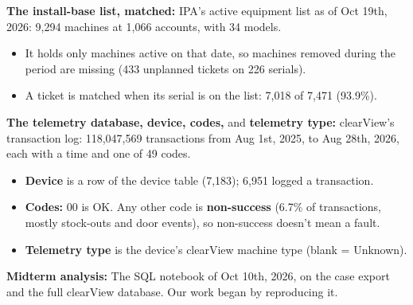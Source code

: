 \begin{ipadefs}
\begin{itemize}
\end{itemize}
\item \textbf{The install-base list, matched:} IPA's active equipment list as of Oct 19th, 2026: 9,294 machines at 1,066 accounts, with 34 models.
\begin{itemize}
\item It holds only machines active on that date, so machines removed during the period are missing (433 unplanned tickets on 226 serials).
\item A ticket is matched when its serial is on the list: 7,018 of 7,471 (93.9\%).
\end{itemize}
\item \textbf{The telemetry database, device, codes,} and \textbf{telemetry type:} clearView's transaction log: 118,047,569 transactions from Aug 1st, 2025, to Aug 28th, 2026, each with a time and one of 49 codes.
\begin{itemize}
\item \textbf{Device} is a row of the device table (7,183); 6,951 logged a transaction.
\item \textbf{Codes:} 00 is OK. Any other code is \textbf{non-success} (6.7\% of transactions, mostly stock-outs and door events), so non-success doesn't mean a fault.
\item \textbf{Telemetry type} is the device's clearView machine type (blank = Unknown).
\end{itemize}
\item \textbf{Midterm analysis:} The SQL notebook of Oct 10th, 2026, on the case export and the full clearView database. Our work began by reproducing it.
\end{ipadefs}

